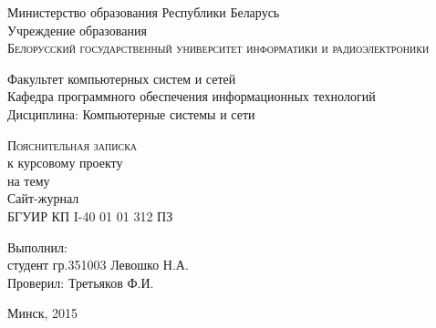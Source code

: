\begin{titlepage}
\newpage
 \begin{center}
  
    Министерство образования Республики Беларусь\\
    \vspace{1em}
    Учреждение образования\\
  \textsc{Белорусский государственный университет информатики и радиоэлектроники}
    \vspace{2em}
    \begin{flushleft}
    Факультет компьютерных систем и сетей\\
	 \vspace{1em}
    Кафедра программного обеспечения информационных технологий\\
	 \vspace{1em}
   Дисциплина: Компьютерные системы и сети\\
	 \vspace{1em}
    \end{flushleft}
    
	\vspace{5em}
    \textsc{Пояснительная записка}\\ к курсовому проекту\\на тему\\
    \bigskip
    {Сайт-журнал}\\
      \bigskip  
    БГУИР КП  I-40 01 01  312  ПЗ
  
\end{center}

\vspace{8em}

\begin{flushleft}
	
	Выполнил:\\
	студент гр.351003 \hspace{7cm} Левошко Н.А.\\ 
	Проверил: \hspace{8.6cm} Третьяков Ф.И.
\end{flushleft}

\vfill


\begin{center}
   Минск, 2015
\end{center}
\end{titlepage}